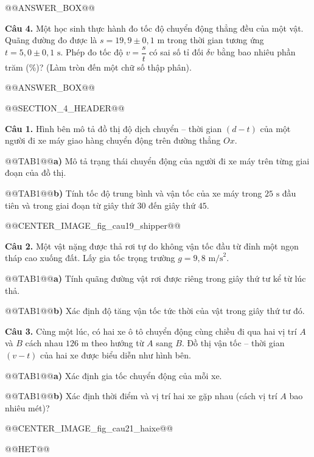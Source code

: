 \documentclass{article}
\begin{document}
@@ANSWER_BOX@@

\textbf{Câu 4.} Một học sinh thực hành đo tốc độ chuyển động thẳng đều của một vật. Quãng đường đo được là $s = 19{,}9 \pm 0{,}1\text{ m}$ trong thời gian tương ứng $t = 5{,}0 \pm 0{,}1\text{ s}$. Phép đo tốc độ $v = \dfrac{s}{t}$ có sai số tỉ đối $\delta v$ bằng bao nhiêu phần trăm (\%)? (Làm tròn đến một chữ số thập phân).

@@ANSWER_BOX@@

@@SECTION_4_HEADER@@

\textbf{Câu 1.} Hình bên mô tả đồ thị độ dịch chuyển -- thời gian $(d - t)$ của một người đi xe máy giao hàng chuyển động trên đường thẳng $Ox$.

@@TAB1@@\textbf{a)} Mô tả trạng thái chuyển động của người đi xe máy trên từng giai đoạn của đồ thị.

@@TAB1@@\textbf{b)} Tính tốc độ trung bình và vận tốc của xe máy trong $25\text{ s}$ đầu tiên và trong giai đoạn từ giây thứ $30$ đến giây thứ $45$.

@@CENTER_IMAGE_fig_cau19_shipper@@

\textbf{Câu 2.} Một vật nặng được thả rơi tự do không vận tốc đầu từ đỉnh một ngọn tháp cao xuống đất. Lấy gia tốc trọng trường $g = 9{,}8\text{ m/s}^2$.

@@TAB1@@\textbf{a)} Tính quãng đường vật rơi được riêng trong giây thứ tư kể từ lúc thả.

@@TAB1@@\textbf{b)} Xác định độ tăng vận tốc tức thời của vật trong giây thứ tư đó.

\textbf{Câu 3.} Cùng một lúc, có hai xe ô tô chuyển động cùng chiều đi qua hai vị trí $A$ và $B$ cách nhau $126\text{ m}$ theo hướng từ $A$ sang $B$. Đồ thị vận tốc -- thời gian $(v - t)$ của hai xe được biểu diễn như hình bên.

@@TAB1@@\textbf{a)} Xác định gia tốc chuyển động của mỗi xe.

@@TAB1@@\textbf{b)} Xác định thời điểm và vị trí hai xe gặp nhau (cách vị trí $A$ bao nhiêu mét)?

@@CENTER_IMAGE_fig_cau21_haixe@@



@@HET@@
\end{document}
